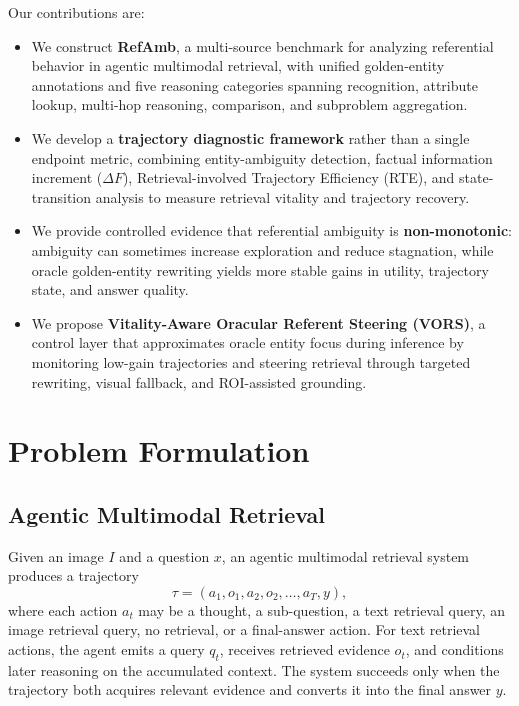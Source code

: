 \documentclass{article}
\newcommand{\query}{q}
\begin{document}
Our contributions are:
\begin{itemize}
    \item We construct \textbf{RefAmb}, a multi-source benchmark for analyzing referential behavior in agentic multimodal retrieval, with unified golden-entity annotations and five reasoning categories spanning recognition, attribute lookup, multi-hop reasoning, comparison, and subproblem aggregation.
    \item We develop a \textbf{trajectory diagnostic framework} rather than a single endpoint metric, combining entity-ambiguity detection, factual information increment ($\Delta F$), Retrieval-involved Trajectory Efficiency (RTE), and state-transition analysis to measure retrieval vitality and trajectory recovery.
    \item We provide controlled evidence that referential ambiguity is \textbf{non-monotonic}: ambiguity can sometimes increase exploration and reduce stagnation, while oracle golden-entity rewriting yields more stable gains in utility, trajectory state, and answer quality.
    \item We propose \textbf{Vitality-Aware Oracular Referent Steering (VORS)}, a control layer that approximates oracle entity focus during inference by monitoring low-gain trajectories and steering retrieval through targeted rewriting, visual fallback, and ROI-assisted grounding.
\end{itemize}

\section{Problem Formulation}
\subsection{Agentic Multimodal Retrieval}
Given an image $I$ and a question $x$, an agentic multimodal retrieval system produces a trajectory
\begin{equation}
    \tau = (a_1, o_1, a_2, o_2, \ldots, a_T, y),
\end{equation}
where each action $a_t$ may be a thought, a sub-question, a text retrieval query, an image retrieval query, no retrieval, or a final-answer action.
For text retrieval actions, the agent emits a query $\query_t$, receives retrieved evidence $o_t$, and conditions later reasoning on the accumulated context.
The system succeeds only when the trajectory both acquires relevant evidence and converts it into the final answer $y$.
\end{document}
